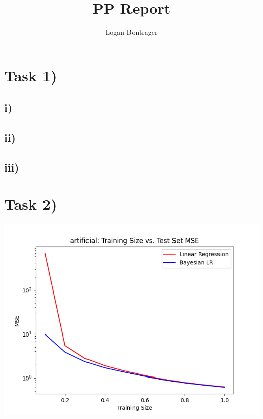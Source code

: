 \documentclass{article}
\begin{document}
\title{PP Report}
\author{Logan Bontrager}
\maketitle

\section*{Task 1)}
\subsection*{i)}

\subsection*{ii)}

\subsection*{iii)}


\section*{Task 2)}

\includegraphics[width=\textwidth]{../output/task1iiartificial.png}
\end{document}

